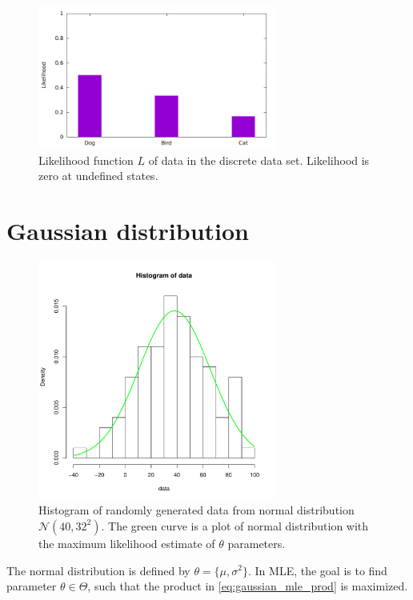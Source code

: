 \documentclass[thesis=B,english]{FITthesis}[2012/06/26]
\begin{document}
\begin{figure}
	\centering
 	\includegraphics[width=0.7\textwidth]{discrete_mle_prob}
 	\caption{Likelihood function $L$ of data in the discrete data set. Likelihood is zero at undefined states.}
 	\label{fig:discrete_mle_prob}
\end{figure}

\section{Gaussian distribution}

\begin{figure}
	\centering
 	\includegraphics[width=0.7\textwidth]{normal_mle}
 	\caption{Histogram of randomly generated data from normal distribution $\mathcal{N}(40,32^2)$. The green curve is a plot of normal distribution with the maximum likelihood estimate of $\theta$ parameters.}
 	\label{fig:normal_mle}
\end{figure}

The normal distribution is defined by $\theta = \{\mu, \sigma^2\}$. In MLE, the goal is to find parameter $\theta \in \Theta$, such that the product in \ref{eq:gaussian_mle_prod} is maximized.
\end{document}
